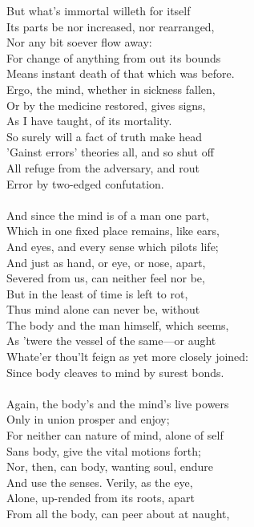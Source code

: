 But what's immortal willeth for itself\\
Its parts be nor increased, nor rearranged,\\
Nor any bit soever flow away:\\
For change of anything from out its bounds\\
Means instant death of that which was before.\\
Ergo, the mind, whether in sickness fallen,\\
Or by the medicine restored, gives signs,\\
As I have taught, of its mortality.\\
So surely will a fact of truth make head\\
'Gainst errors' theories all, and so shut off\\
All refuge from the adversary, and rout\\
Error by two-edged confutation.\\
\\
And since the mind is of a man one part,\\
Which in one fixed place remains, like ears,\\
And eyes, and every sense which pilots life;\\
And just as hand, or eye, or nose, apart,\\
Severed from us, can neither feel nor be,\\
But in the least of time is left to rot,\\
Thus mind alone can never be, without\\
The body and the man himself, which seems,\\
As 'twere the vessel of the same—or aught\\
Whate'er thou'lt feign as yet more closely joined:\\
Since body cleaves to mind by surest bonds.\\
\\
Again, the body's and the mind's live powers\\
Only in union prosper and enjoy;\\
For neither can nature of mind, alone of self\\
Sans body, give the vital motions forth;\\
Nor, then, can body, wanting soul, endure\\
And use the senses. Verily, as the eye,\\
Alone, up-rended from its roots, apart\\
From all the body, can peer about at naught,\\
